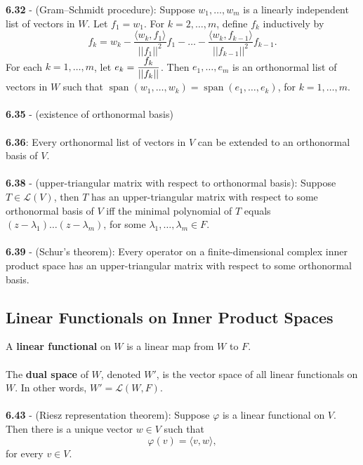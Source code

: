 \documentclass{article}
\DeclareMathOperator{\Span}{span}
\theoremstyle{definition}
\begin{document}
\textbf{6.32} - (Gram–Schmidt procedure): Suppose $w_1, \dots, w_m$ is a linearly independent list of vectors in $W$. Let $f_1 = w_1$. For $k = 2, \dots, m$, define $f_k$ inductively by $$f_k = w_k - \frac{\langle w_k, f_1 \rangle}{||f_1||^2}f_1 - \dots - \frac{\langle w_k, f_{k - 1} \rangle}{||f_{k - 1}||^2}f_{k - 1}.$$ For each $k = 1, \dots, m$, let $e_k = \mathlarger{\frac{f_k}{||f_k||}}$. Then $e_1, \dots, e_m$ is an orthonormal list of vectors in $W$ such that $\Span(w_1, \dots, w_k) = \Span(e_1, \dots, e_k)$, for $k = 1, \dots, m$. \\ \\
\textbf{6.35} - (existence of orthonormal basis) \\ \\
\textbf{6.36}: Every orthonormal list of vectors in $V$ can be extended to an orthonormal basis of $V$. \\ \\
\textbf{6.38} - (upper-triangular matrix with respect to orthonormal basis): Suppose $T \in \mathcal{L}(V)$, then $T$ has an upper-triangular matrix with respect to some orthonormal basis of $V$ iff the minimal polynomial of $T$ equals $(z - \lambda_1) \dots (z - \lambda_m)$, for some $\lambda_1, \dots, \lambda_m \in F$. \\ \\
\textbf{6.39} - (Schur’s theorem): Every operator on a finite-dimensional complex inner product space has an upper-triangular matrix with respect to some orthonormal basis.
\subsection*{Linear Functionals on Inner Product Spaces}
A \textbf{linear functional} on $W$ is a linear map from $W$ to $F$. \\ \\
The \textbf{dual space} of $W$, denoted $W'$, is the vector space of all linear functionals on $W$. In other words, $W' = \mathcal{L}(W, F)$. \\ \\
\textbf{6.43} - (Riesz representation theorem): Suppose $\varphi$ is a linear functional on $V$. Then there is a unique vector $w \in V$ such that $$\varphi(v) = \langle v, w \rangle,$$ for every $v \in V.$
\end{document}
